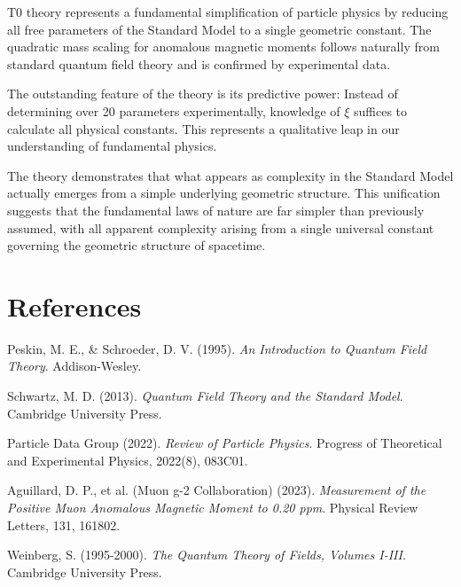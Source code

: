 \documentclass[12pt,a4paper]{article}
\begin{document}
	T0 theory represents a fundamental simplification of particle physics by reducing all free parameters of the Standard Model to a single geometric constant. The quadratic mass scaling for anomalous magnetic moments follows naturally from standard quantum field theory and is confirmed by experimental data.
	
	The outstanding feature of the theory is its predictive power: Instead of determining over 20 parameters experimentally, knowledge of $\xi$ suffices to calculate all physical constants. This represents a qualitative leap in our understanding of fundamental physics.
	
	The theory demonstrates that what appears as complexity in the Standard Model actually emerges from a simple underlying geometric structure. This unification suggests that the fundamental laws of nature are far simpler than previously assumed, with all apparent complexity arising from a single universal constant governing the geometric structure of spacetime.
	
	\section{References}
	
	\begin{thebibliography}{10}
		
		Peskin, M. E., \& Schroeder, D. V. (1995). 
		\textit{An Introduction to Quantum Field Theory}. 
		Addison-Wesley.
		
		Schwartz, M. D. (2013). 
		\textit{Quantum Field Theory and the Standard Model}. 
		Cambridge University Press.
		
		Particle Data Group (2022). 
		\textit{Review of Particle Physics}. 
		Progress of Theoretical and Experimental Physics, 2022(8), 083C01.
		
		Aguillard, D. P., et al. (Muon g-2 Collaboration) (2023). 
		\textit{Measurement of the Positive Muon Anomalous Magnetic Moment to 0.20 ppm}. 
		Physical Review Letters, 131, 161802.
		
		Weinberg, S. (1995-2000). 
		\textit{The Quantum Theory of Fields, Volumes I-III}. 
		Cambridge University Press.
		
	\end{thebibliography}
	
\end{document}
